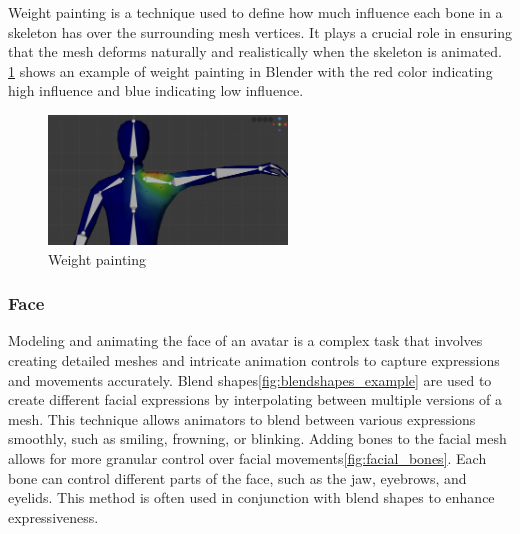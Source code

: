 Weight painting is a technique used to define how much influence each bone in a skeleton has over the surrounding mesh vertices. It plays a crucial role in ensuring that the mesh deforms naturally and realistically when the skeleton is animated. \ref{fig:weight_painting} shows an example of weight painting in Blender with the red color indicating high influence and blue indicating low influence.

\begin{figure}
  \centering \includegraphics[width = 2.5in]{images/background_work/weight_painting.png}
  \caption{Weight painting}
  \label{fig:weight_painting}
\end{figure}

\subsubsection{Face}

Modeling and animating the face of an avatar is a complex task that involves creating detailed meshes and intricate animation controls to capture expressions and movements accurately. Blend shapes\ref{fig:blendshapes_example} are used to create different facial expressions by interpolating between multiple versions of a mesh. This technique allows animators to blend between various expressions smoothly, such as smiling, frowning, or blinking. Adding bones to the facial mesh allows for more granular control over facial movements\ref{fig:facial_bones}. Each bone can control different parts of the face, such as the jaw, eyebrows, and eyelids. This method is often used in conjunction with blend shapes to enhance expressiveness.

